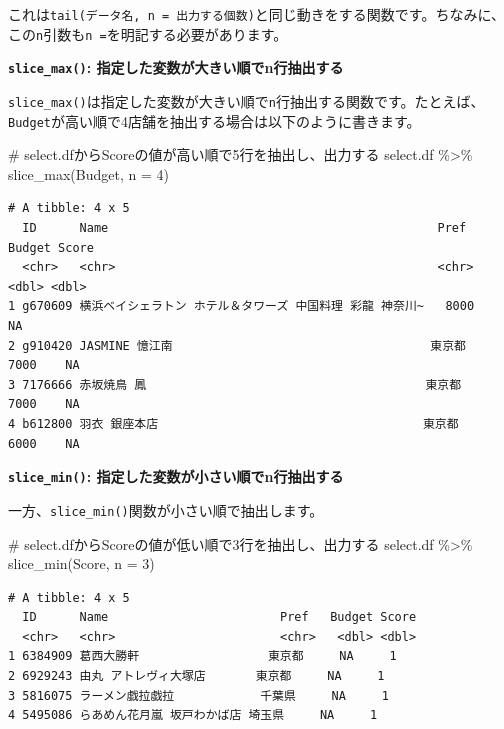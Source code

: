 \documentclass[
  a4paper,
  pandoc,
  ja=standard,
  jafont=haranoaji]{bxjsbook}
\newenvironment{Shaded}{\begin{snugshade}}{\end{snugshade}}
\newcommand{\AttributeTok}[1]{\textcolor[rgb]{0.00,0.48,0.65}{#1}}
\newcommand{\CommentTok}[1]{\textcolor[rgb]{0.37,0.37,0.37}{#1}}
\newcommand{\DecValTok}[1]{\textcolor[rgb]{0.68,0.00,0.00}{#1}}
\newcommand{\FunctionTok}[1]{\textcolor[rgb]{0.28,0.35,0.67}{#1}}
\newcommand{\NormalTok}[1]{\textcolor[rgb]{0.00,0.48,0.65}{#1}}
\newcommand{\SpecialCharTok}[1]{\textcolor[rgb]{0.37,0.37,0.37}{#1}}
\begin{document}
これは\texttt{tail(データ名,\ n\ =\ 出力する個数)}と同じ動きをする関数です。ちなみに、この\texttt{n}引数も\texttt{n\ =}を明記する必要があります。

\textbf{\texttt{slice\_max()}: 指定した変数が大きい順でn行抽出する}

\texttt{slice\_max()}は指定した変数が大きい順で\texttt{n}行抽出する関数です。たとえば、\texttt{Budget}が高い順で4店舗を抽出する場合は以下のように書きます。

\begin{Shaded}
\begin{Highlighting}[numbers=left,,]
\CommentTok{\# select.dfからScoreの値が高い順で5行を抽出し、出力する}
\NormalTok{select.df }\SpecialCharTok{\%\textgreater{}\%} 
  \FunctionTok{slice\_max}\NormalTok{(Budget, }\AttributeTok{n =} \DecValTok{4}\NormalTok{)}
\end{Highlighting}
\end{Shaded}

\begin{verbatim}
# A tibble: 4 x 5
  ID      Name                                              Pref    Budget Score
  <chr>   <chr>                                             <chr>    <dbl> <dbl>
1 g670609 横浜ベイシェラトン ホテル＆タワーズ 中国料理 彩龍 神奈川~   8000    NA
2 g910420 JASMINE 憶江南                                    東京都    7000    NA
3 7176666 赤坂焼鳥 鳳                                       東京都    7000    NA
4 b612800 羽衣 銀座本店                                     東京都    6000    NA
\end{verbatim}

\textbf{\texttt{slice\_min()}: 指定した変数が小さい順でn行抽出する}

一方、\texttt{slice\_min()}関数が小さい順で抽出します。

\begin{Shaded}
\begin{Highlighting}[numbers=left,,]
\CommentTok{\# select.dfからScoreの値が低い順で3行を抽出し、出力する}
\NormalTok{select.df }\SpecialCharTok{\%\textgreater{}\%} 
  \FunctionTok{slice\_min}\NormalTok{(Score, }\AttributeTok{n =} \DecValTok{3}\NormalTok{)}
\end{Highlighting}
\end{Shaded}

\begin{verbatim}
# A tibble: 4 x 5
  ID      Name                        Pref   Budget Score
  <chr>   <chr>                       <chr>   <dbl> <dbl>
1 6384909 葛西大勝軒                  東京都     NA     1
2 6929243 由丸 アトレヴィ大塚店       東京都     NA     1
3 5816075 ラーメン戯拉戯拉            千葉県     NA     1
4 5495086 らあめん花月嵐 坂戸わかば店 埼玉県     NA     1
\end{verbatim}
\end{document}

